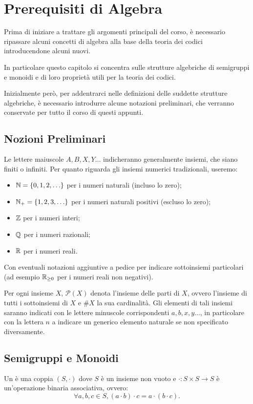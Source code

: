 \chapter{Prerequisiti di Algebra}

Prima di iniziare a trattare gli argomenti principali del corso,
è necessario ripassare alcuni concetti di algebra alla base della teoria dei codici introducendone alcuni nuovi.

In particolare questo capitolo si concentra sulle strutture algebriche di semigruppi e monoidi e di loro proprietà utili per la teoria dei codici.

Inizialmente però, per addentrarci nelle definizioni delle suddette strutture algebriche, è necessario introdurre alcune notazioni preliminari, che verranno conservate per tutto il corso di questi appunti.

\section{Nozioni Preliminari}

Le lettere maiuscole \(A, B, X, Y \ldots\) indicheranno generalmente insiemi, che siano finiti o infiniti.
Per quanto riguarda gli insiemi numerici tradizionali, useremo:
\begin{itemize}
  \item \(\N = \set{0,1,2,\ldots}\) per i numeri naturali (incluso lo zero);
  \item \(\N_+ = \set{1,2,3,\ldots}\) per i numeri naturali positivi (escluso lo zero);
  \item \(\mathbb{Z}\) per i numeri interi;
  \item \(\mathbb{Q}\) per i numeri razionali;
  \item \(\mathbb{R}\) per i numeri reali.
\end{itemize}
Con eventuali notazioni aggiuntive a pedice per indicare sottoinsiemi particolari (ad esempio \(\mathbb{R}_{\geq 0}\) per i numeri reali non negativi).

Per ogni insieme \(X\), \(\mathcal{P}(X)\) denota l'insieme delle parti di \(X\), ovvero l'insieme di tutti i sottoinsiemi di \(X\) e \(\#X\) la sua cardinalità.
Gli elementi di tali insiemi saranno indicati con le lettere minuscole corrispondenti \(a,b,x,y \ldots\), in particolare con la lettera \(n\) a indicare un generico elemento naturale se non specificato diversamente.

\section{Semigruppi e Monoidi}
\begin{definition}[Semigruppo]
  Un  è una coppia \((S, \cdot)\) dove \(S\) è un insieme non vuoto e \(\cdot : S \times S \to S\) è un'operazione binaria associativa, ovvero:
  \[\forall a,b,c \in S, (a \cdot b) \cdot c = a \cdot (b \cdot c).\]
\end{definition}

